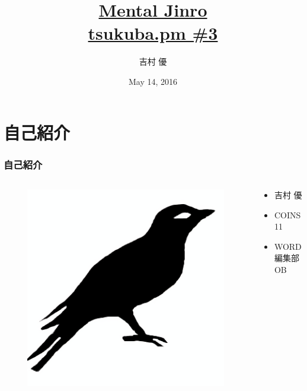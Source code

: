\documentclass[12pt, unicode, svgnames]{beamer}
\title[Mental Jinro]{%
  \href{https://github.com/y-yu/mental-jinro-slide}{Mental Jinro} \\
  \href{http://connpass.com/event/30661/}{\normalsize tsukuba.pm \#3}
}
\author{吉村 優}
\date{May 14, 2016}
\institute[\url{https://twitter.com/\_yyu\_}]{%
  \url{https://twitter.com/\_yyu\_}\\
  \url{http://qiita.com/yyu}\\
  \url{https://github.com/y-yu}\\
}
\begin{document}
\frame{\maketitle}

\section{自己紹介}
\begin{frame}[fragile]
  \frametitle{自己紹介}
  
  \begin{columns}
    \begin{column}{0.25\textwidth}
      \centering
      \begin{figure}
        \includegraphics[width=\textwidth]{img/bird2x.png}
      \end{figure}
    \end{column}
    \begin{column}{0.75\textwidth}
      \begin{itemize}
        \item<2-> 吉村 優
        \item<3-> COINS11
        \item<4-> WORD編集部OB
      \end{itemize}
    \end{column}
  \end{columns}
\end{frame}
\end{document}
